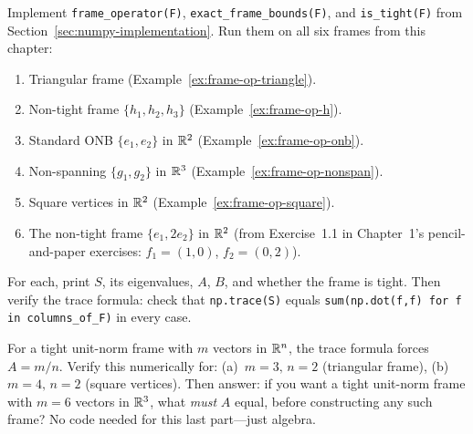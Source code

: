 \begin{exercisebox}[title={Lab Exercise 3.1: The Full Frame Operator Pipeline}]
Implement \texttt{frame\_operator(F)}, \texttt{exact\_frame\_bounds(F)},
and \texttt{is\_tight(F)} from Section~\ref{sec:numpy-implementation}.
Run them on all six frames from this chapter:
\begin{enumerate}[label=(\alph*)]
  \item Triangular frame (Example~\ref{ex:frame-op-triangle}).
  \item Non-tight frame $\{h_1,h_2,h_3\}$ (Example~\ref{ex:frame-op-h}).
  \item Standard ONB $\{e_1,e_2\}$ in $\mathbb{R}^2$ (Example~\ref{ex:frame-op-onb}).
  \item Non-spanning $\{g_1,g_2\}$ in $\mathbb{R}^3$ (Example~\ref{ex:frame-op-nonspan}).
  \item Square vertices in $\mathbb{R}^2$ (Example~\ref{ex:frame-op-square}).
  \item The non-tight frame $\{e_1, 2e_2\}$ in $\mathbb{R}^2$ (from Exercise~1.1
        in Chapter~1's pencil-and-paper exercises: $f_1=(1,0)$,
        $f_2=(0,2)$).
\end{enumerate}
For each, print $S$, its eigenvalues, $A$, $B$, and whether the frame is
tight. Then verify the trace formula: check that
\texttt{np.trace(S)} equals \texttt{sum(np.dot(f,f) for f in columns\_of\_F)}
in every case.
\end{exercisebox}

\begin{exercisebox}[title={Lab Exercise 3.2: Tightness from the Trace}]
For a tight unit-norm frame with $m$ vectors in $\mathbb{R}^n$, the trace formula
forces $A = m/n$. Verify this numerically for:
(a)~$m=3,\,n=2$ (triangular frame),
(b)~$m=4,\,n=2$ (square vertices).
Then answer: if you want a tight unit-norm frame with $m=6$ vectors in
$\mathbb{R}^3$, what \emph{must} $A$ equal, before constructing any such frame?
No code needed for this last part---just algebra.
\end{exercisebox}

